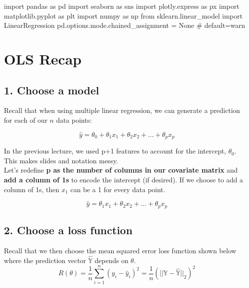 \documentclass[
  letterpaper,
  DIV=11,
  numbers=noendperiod]{scrreprt}
\newenvironment{Shaded}{\begin{snugshade}}{\end{snugshade}}
\newcommand{\CommentTok}[1]{\textcolor[rgb]{0.37,0.37,0.37}{#1}}
\newcommand{\ImportTok}[1]{\textcolor[rgb]{0.00,0.46,0.62}{#1}}
\newcommand{\NormalTok}[1]{\textcolor[rgb]{0.00,0.23,0.31}{#1}}
\newcommand{\OperatorTok}[1]{\textcolor[rgb]{0.37,0.37,0.37}{#1}}
\newcommand{\VariableTok}[1]{\textcolor[rgb]{0.07,0.07,0.07}{#1}}
\begin{document}
\begin{Shaded}
\begin{Highlighting}[]
\ImportTok{import}\NormalTok{ pandas }\ImportTok{as}\NormalTok{ pd}
\ImportTok{import}\NormalTok{ seaborn }\ImportTok{as}\NormalTok{ sns}
\ImportTok{import}\NormalTok{ plotly.express }\ImportTok{as}\NormalTok{ px}
\ImportTok{import}\NormalTok{ matplotlib.pyplot }\ImportTok{as}\NormalTok{ plt}
\ImportTok{import}\NormalTok{ numpy }\ImportTok{as}\NormalTok{ np}
\ImportTok{from}\NormalTok{ sklearn.linear\_model }\ImportTok{import}\NormalTok{ LinearRegression}
\NormalTok{pd.options.mode.chained\_assignment }\OperatorTok{=} \VariableTok{None}  \CommentTok{\# default=\textquotesingle{}warn\textquotesingle{}}
\end{Highlighting}
\end{Shaded}

\section{OLS Recap}\label{ols-recap}

\subsection{1. Choose a model}\label{choose-a-model}

Recall that when using multiple linear regression, we can generate a
prediction for each of our \(n\) data points:

\[\hat{y} =\theta_{0} + \theta_{1}x_{1} + \theta_{2}x_{2} + ... + \theta_{p}x_{p}\]

In the previous lecture, we used p+1 features to account for the
intercept, \(\theta_0\). This makes slides and notation messy.\\
Let's redefine \textbf{p as the number of columns in our covariate
matrix} and \textbf{add a column of 1s} to encode the intercept (if
desired). If we choose to add a column of 1s, then \(x_1\) can be a 1
for every data point.

\[\hat{y} =\theta_{1}x_{1} + \theta_{2}x_{2} + ... + \theta_{p}x_{p}\]

\subsection{2. Choose a loss function}\label{choose-a-loss-function}

Recall that we then choose the mean squared error loss function shown
below where the prediction vector \(\hat{\mathbb{Y}}\) depends on
\(\theta\).
\[R(\theta) = \frac{1}{n} \sum_{i=1}^n (y_i - \hat{y}_i)^2 = \frac{1}{n} (||\mathbb{Y} - \hat{\mathbb{Y}}||_2)^2\]
\end{document}
